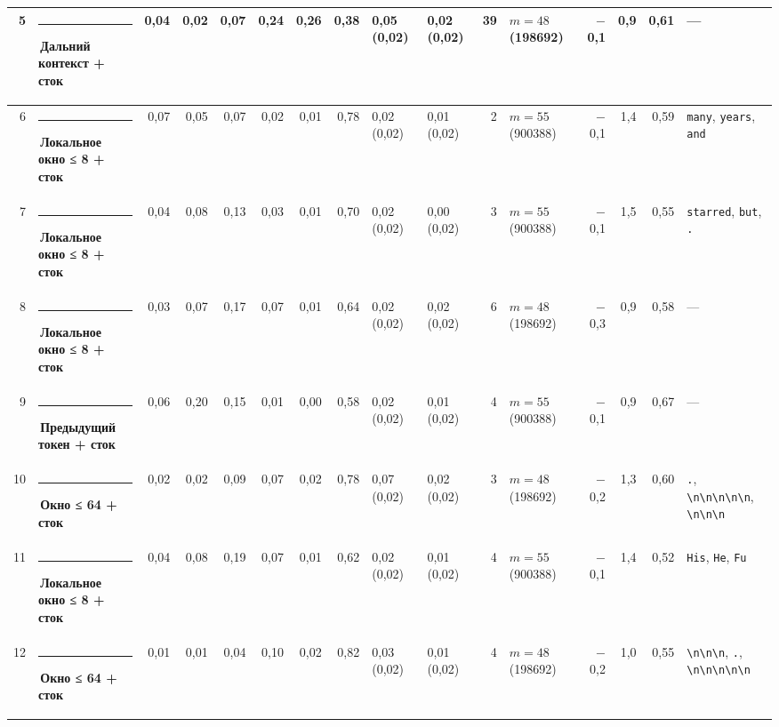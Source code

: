 \documentclass[10pt]{article}
\begin{document}
\begin{minipage}{\linewidth}
\begin{center}
{\begin{tabular}{|r|l|r|r|r|r|r|r|l|l|r|l|r|r|r|l|}
5 & \textcolor[HTML]{C3C2B7}{\rule{0.62em}{0.62em}}\,Дальний контекст + сток & 0,04 & 0,02 & 0,07 & 0,24 & 0,26 & 0,38 & 0,05 (0,02) & 0,02 (0,02) & 39 & $m{=}48$ (198692) & $-$0,1 & 0,9 & 0,61 & — \\ \hline
6 & \textcolor[HTML]{1BAF7A}{\rule{0.62em}{0.62em}}\,\textbf{Локальное окно ≤ 8 + сток} & 0,07 & 0,05 & 0,07 & 0,02 & 0,01 & 0,78 & 0,02 (0,02) & 0,01 (0,02) & 2 & $m{=}55$ (900388) & $-$0,1 & 1,4 & 0,59 & \texttt{\textvisiblespace{}many}, \texttt{\textvisiblespace{}years}, \texttt{\textvisiblespace{}and} \\ \hline
7 & \textcolor[HTML]{1BAF7A}{\rule{0.62em}{0.62em}}\,\textbf{Локальное окно ≤ 8 + сток} & 0,04 & 0,08 & 0,13 & 0,03 & 0,01 & 0,70 & 0,02 (0,02) & 0,00 (0,02) & 3 & $m{=}55$ (900388) & $-$0,1 & 1,5 & 0,55 & \texttt{\textvisiblespace{}starred}, \texttt{\textvisiblespace{}but}, \texttt{\textvisiblespace{}.} \\ \hline
8 & \textcolor[HTML]{1BAF7A}{\rule{0.62em}{0.62em}}\,\textbf{Локальное окно ≤ 8 + сток} & 0,03 & 0,07 & 0,17 & 0,07 & 0,01 & 0,64 & 0,02 (0,02) & 0,02 (0,02) & 6 & $m{=}48$ (198692) & $-$0,3 & 0,9 & 0,58 & — \\ \hline
9 & \textcolor[HTML]{2A78D6}{\rule{0.62em}{0.62em}}\,\textbf{Предыдущий токен + сток} & 0,06 & 0,20 & 0,15 & 0,01 & 0,00 & 0,58 & 0,02 (0,02) & 0,01 (0,02) & 4 & $m{=}55$ (900388) & $-$0,1 & 0,9 & 0,67 & — \\ \hline
10 & \textcolor[HTML]{EDA100}{\rule{0.62em}{0.62em}}\,\textbf{Окно ≤ 64 + сток} & 0,02 & 0,02 & 0,09 & 0,07 & 0,02 & 0,78 & 0,07 (0,02) & 0,02 (0,02) & 3 & $m{=}48$ (198692) & $-$0,2 & 1,3 & 0,60 & \texttt{\textvisiblespace{}.}, \texttt{\textvisiblespace{}\textbackslash{}n\textbackslash{}n\textbackslash{}n\textbackslash{}n\textbackslash{}n}, \texttt{\textvisiblespace{}\textbackslash{}n\textbackslash{}n\textbackslash{}n} \\ \hline
11 & \textcolor[HTML]{1BAF7A}{\rule{0.62em}{0.62em}}\,\textbf{Локальное окно ≤ 8 + сток} & 0,04 & 0,08 & 0,19 & 0,07 & 0,01 & 0,62 & 0,02 (0,02) & 0,01 (0,02) & 4 & $m{=}55$ (900388) & $-$0,1 & 1,4 & 0,52 & \texttt{\textvisiblespace{}His}, \texttt{\textvisiblespace{}He}, \texttt{\textvisiblespace{}Fu} \\ \hline
12 & \textcolor[HTML]{EDA100}{\rule{0.62em}{0.62em}}\,\textbf{Окно ≤ 64 + сток} & 0,01 & 0,01 & 0,04 & 0,10 & 0,02 & 0,82 & 0,03 (0,02) & 0,01 (0,02) & 4 & $m{=}48$ (198692) & $-$0,2 & 1,0 & 0,55 & \texttt{\textvisiblespace{}\textbackslash{}n\textbackslash{}n\textbackslash{}n}, \texttt{\textvisiblespace{}.}, \texttt{\textvisiblespace{}\textbackslash{}n\textbackslash{}n\textbackslash{}n\textbackslash{}n\textbackslash{}n} \\ \hline

\end{tabular}}
\end{center}
\end{minipage}
\end{document}
